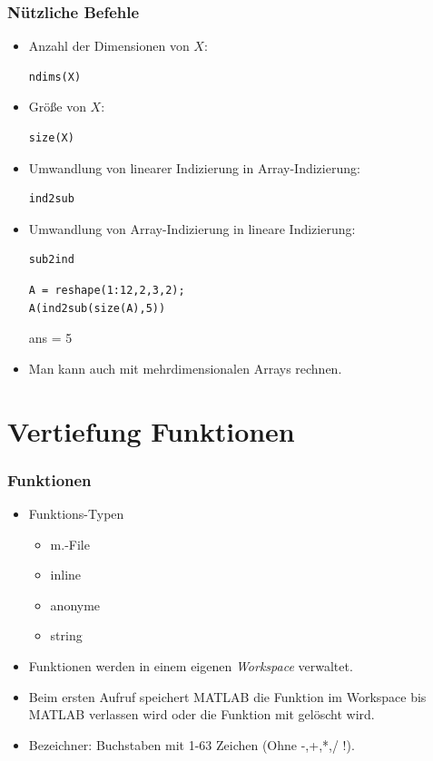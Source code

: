 \documentclass[hyperref={xetex}]{beamer}
\begin{document}
%
% 
\begin{frame}[fragile]\frametitle{N\"utzliche Befehle}
\begin{itemize}
\item Anzahl der Dimensionen von $X$: 
\begin{lstlisting}
ndims(X) 
\end{lstlisting}
\item Gr\"o{\ss}e von $X$: 
\begin{lstlisting}
size(X)
\end{lstlisting}
\item Umwandlung von linearer Indizierung in Array-Indizierung: 
\begin{lstlisting}
ind2sub
\end{lstlisting}
\item Umwandlung von Array-Indizierung in lineare Indizierung:
 \begin{lstlisting}
sub2ind
\end{lstlisting}
\begin{lstlisting}
A = reshape(1:12,2,3,2);
A(ind2sub(size(A),5))
\end{lstlisting}
\begin{matlab}
ans =
     5
\end{matlab}
\item Man kann auch mit mehrdimensionalen Arrays rechnen.
\end{itemize}

\end{frame}
%



\section{Vertiefung Funktionen}

%
%
\begin{frame}[fragile]\frametitle{Funktionen}
\begin{itemize}
 \item Funktions-Typen
\begin{itemize}
\item m.-File
\item inline
\item anonyme
\item string
\end{itemize}
\item Funktionen werden in einem eigenen {\it Workspace} verwaltet.
\item Beim ersten Aufruf speichert MATLAB die Funktion im Workspace bis MATLAB
  verlassen wird oder die Funktion  mit   gel\"oscht wird.
\item Bezeichner: Buchstaben mit 1-63 Zeichen (Ohne -,+,*,/ !). 
\end{itemize}
\end{frame}
\end{document}
